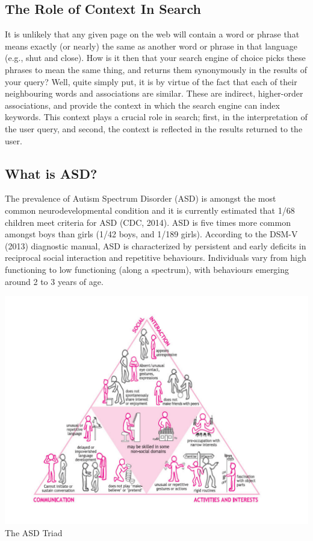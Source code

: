 \documentclass[10pt]{article}
\begin{document}
\subsection{The Role of Context In Search}
It is unlikely that any given page on the web will contain a word or phrase that means exactly (or nearly) the same as another word or phrase in that language (e.g., shut and close). How is it then that your search engine of choice picks these phrases to mean the same thing, and returns them synonymously in the results of your query? Well, quite simply put, it is by virtue of the fact that each of their neighbouring words and associations are similar. These are indirect, higher-order associations, and provide the context in which the search engine can index keywords. This context plays a crucial role in search; first, in the interpretation of the user query, and second, the context is reflected in the results returned to the user.

\subsection{What is ASD?}
The prevalence of Autism Spectrum Disorder (ASD) is amongst the most common neurodevelopmental condition and it is currently estimated that 1/68 children meet criteria for ASD (CDC, 2014). ASD is five times more common amongst boys than girls (1/42 boys, and 1/189 girls). According to the DSM-V (2013) diagnostic manual, ASD is characterized by persistent and early deficits in reciprocal social interaction and repetitive behaviours. Individuals vary from high functioning to low functioning (along a spectrum), with behaviours emerging around 2 to 3 years of age. 

\begin{center}
\includegraphics[scale=0.5]{asd}\\
The ASD Triad \cite{triad}
\end{center}
\end{document}
